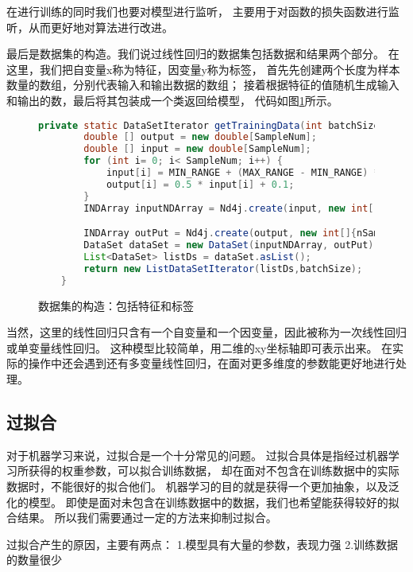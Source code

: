 在进行训练的同时我们也要对模型进行监听，
主要用于对函数的损失函数进行监听，从而更好地对算法进行改进。

最后是数据集的构造。我们说过线性回归的数据集包括数据和结果两个部分。
在这里，我们把自变量x称为特征，因变量y称为标签，
首先先创建两个长度为样本数量的数组，分别代表输入和输出数据的数组；
接着根据特征的值随机生成输入和输出的数，最后将其包装成一个类返回给模型，
代码如图\ref{statics_set_creation}所示。

\begin{figure}[!ht]
\begin{lstlisting}[language=Java]
  private static DataSetIterator getTrainingData(int batchSize, Random rand) {
        double [] output = new double[SampleNum];
        double [] input = new double[SampleNum];
        for (int i= 0; i< SampleNum; i++) {
            input[i] = MIN_RANGE + (MAX_RANGE - MIN_RANGE) * rand.nextDouble();
            output[i] = 0.5 * input[i] + 0.1;
        }
        INDArray inputNDArray = Nd4j.create(input, new int[]{nSamples,1});

        INDArray outPut = Nd4j.create(output, new int[]{nSamples, 1});
        DataSet dataSet = new DataSet(inputNDArray, outPut);
        List<DataSet> listDs = dataSet.asList();
        return new ListDataSetIterator(listDs,batchSize);
    }
\end{lstlisting}
\caption{数据集的构造：包括特征和标签}
\label{statics_set_creation}
\end{figure}


当然，这里的线性回归只含有一个自变量和一个因变量，因此被称为一次线性回归或单变量线性回归。
这种模型比较简单，用二维的xy坐标轴即可表示出来。
在实际的操作中还会遇到还有多变量线性回归，在面对更多维度的参数能更好地进行处理。


\subsection{过拟合}
对于机器学习来说，过拟合是一个十分常见的问题。
过拟合具体是指经过机器学习所获得的权重参数，可以拟合训练数据，
却在面对不包含在训练数据中的实际数据时，不能很好的拟合他们。
机器学习的目的就是获得一个更加抽象，以及泛化的模型。
即使是面对未包含在训练数据中的数据，我们也希望能获得较好的拟合结果。
所以我们需要通过一定的方法来抑制过拟合。

过拟合产生的原因，主要有两点：
1.模型具有大量的参数，表现力强
2.训练数据的数量很少


